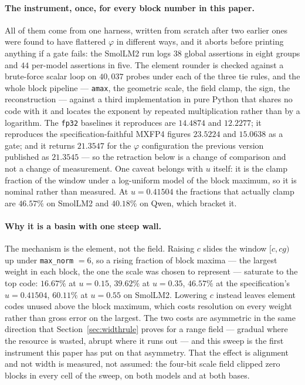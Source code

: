 \documentclass[11pt]{article}
\theoremstyle{definition}
\begin{document}
\paragraph{The instrument, once, for every block number in this paper.} All of
them come from one harness, written from scratch after two earlier ones were
found to have flattered $\varphi$ in different ways, and it aborts before
printing anything if a gate fails: the SmolLM2 run logs $38$ global assertions
in eight groups and $44$ per-model assertions in five. The element rounder is
checked against a brute-force scalar loop on $40{,}037$ probes under each of
the three tie rules, and the whole block pipeline --- \texttt{amax}, the
geometric scale, the field clamp, the sign, the reconstruction --- against a
third implementation in pure Python that shares no code with it and locates the
exponent by repeated multiplication rather than by a logarithm. The
\texttt{fp32} baselines it reproduces are $14.4874$ and $12.2277$; it
reproduces the specification-faithful MXFP4 figures $23.5224$ and $15.0638$ as
a gate; and it returns $21.3547$ for the $\varphi$ configuration the previous
version published as $21.3545$ --- so the retraction below is a change of
comparison and not a change of measurement. One caveat belongs with $u$ itself:
it is the clamp fraction of the window under a log-uniform model of the block
maximum, so it is nominal rather than measured. At $u = 0.41504$ the fractions
that actually clamp are $46.57\%$ on SmolLM2 and $40.18\%$ on Qwen, which
bracket it.

\paragraph{Why it is a basin with one steep wall.} The mechanism is the
element, not the field. Raising $c$ slides the window $[c,cg)$ up under
\texttt{max\_norm} $=6$, so a rising fraction of block maxima --- the largest
weight in each block, the one the scale was chosen to represent --- saturate to
the top code: $16.67\%$ at $u=0.15$, $39.62\%$ at $u=0.35$, $46.57\%$ at the
specification's $u=0.41504$, $60.11\%$ at $u=0.55$ on SmolLM2. Lowering $c$
instead leaves element codes unused above the block maximum, which costs
resolution on every weight rather than gross error on the largest. The two
costs are asymmetric in the same direction that Section~\ref{sec:widthrule}
proves for a range field --- gradual where the resource is wasted, abrupt where
it runs out --- and this sweep is the first instrument this paper has put on
that asymmetry. That the effect is alignment and not width is measured, not
assumed: the four-bit scale field clipped zero blocks in every cell of the
sweep, on both models and at both bases.
\end{document}
